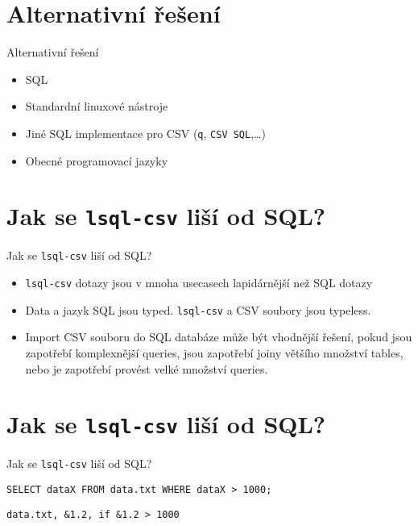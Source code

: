 \documentclass{beamer}
\def\icode#1{\texttt{#1}}
\begin{document}
\section{Alternativní řešení}
\begin{frame}[fragile]{Alternativní řešení}
\begin{itemize}
\item SQL
\item Standardní linuxové nástroje
\item Jiné SQL implementace pro CSV (\icode{q}, \icode{CSV SQL},\ldots)
\item Obecné programovací jazyky
\end{itemize}
\end{frame}
		

\section{Jak se \icode{lsql-csv} liší od SQL?}
\begin{frame}[fragile]{Jak se \icode{lsql-csv} liší od SQL?}
\begin{itemize}
\item \icode{lsql-csv} dotazy jsou v mnoha usecasech lapidárnější než SQL dotazy
\item Data a jazyk SQL jsou typed. \icode{lsql-csv} a CSV soubory jsou typeless.
\item Import CSV souboru do SQL databáze může být vhodnější řešení, 
  pokud jsou zapotřebí komplexnější queries, jsou zapotřebí joiny většího množství tables, 
  nebo je zapotřebí provést velké množství queries.
\end{itemize}
\end{frame}


\section{Jak se \icode{lsql-csv} liší od SQL?}
\begin{frame}[fragile]{Jak se \icode{lsql-csv} liší od SQL?}
\begin{verbatim}
SELECT dataX FROM data.txt WHERE dataX > 1000;
\end{verbatim}

\vskip 1cm

\begin{verbatim}
data.txt, &1.2, if &1.2 > 1000
\end{verbatim}

\end{frame}
\end{document}
